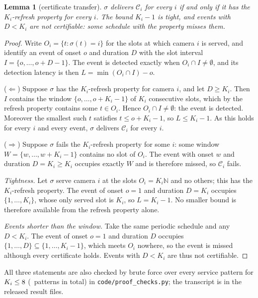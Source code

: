 \documentclass[final,5p,times,twocolumn]{elsarticle}
\newtheorem{lemma}[theorem]{Lemma}
\theoremstyle{definition}
\newcommand{\Ki}{K_i}
\newcommand{\sched}{\sigma}
\newcommand{\Dur}{D}
\newcommand{\Lat}{L}
\begin{document}
\begin{lemma}[certificate transfer]\label{lem:transfer}
$\sched$ delivers $\mathcal{C}_i$ for every $i$ if and only if it has the $\Ki$-refresh property
for every $i$. The bound $\Ki-1$ is tight, and events with $\Dur<\Ki$ are not certifiable: some
schedule with the property misses them.
\end{lemma}
\begin{proof}
Write $O_i=\{t:\sched(t)=i\}$ for the slots at which camera $i$ is served, and identify an
event of onset $o$ and duration $\Dur$ with the slot interval $I=\{o,\dots,o+\Dur-1\}$. The
event is detected exactly when $O_i\cap I\neq\emptyset$, and its detection latency is then
$\Lat=\min(O_i\cap I)-o$.

($\Leftarrow$) Suppose $\sched$ has the $\Ki$-refresh property for camera $i$, and let $\Dur\ge
\Ki$. Then $I$ contains the window $\{o,\dots,o+\Ki-1\}$ of $\Ki$ consecutive slots, which by
the refresh property contains some $t\in O_i$. Hence $O_i\cap I\neq\emptyset$: the event is
detected. Moreover the smallest such $t$ satisfies $t\le o+\Ki-1$, so $\Lat\le\Ki-1$. As this
holds for every $i$ and every event, $\sched$ delivers $\mathcal{C}_i$ for every $i$.

($\Rightarrow$) Suppose $\sched$ fails the $\Ki$-refresh property for some $i$: some window
$W=\{w,\dots,w+\Ki-1\}$ contains no slot of $O_i$. The event with onset $w$ and duration
$\Dur=\Ki\ge\Ki$ occupies exactly $W$ and is therefore missed, so $\mathcal{C}_i$ fails.

\emph{Tightness.} Let $\sched$ serve camera $i$ at the slots $O_i=\Ki\mathbb{N}$ and no others;
this has the $\Ki$-refresh property. The event of onset $o=1$ and duration $\Dur=\Ki$ occupies
$\{1,\dots,\Ki\}$, whose only served slot is $\Ki$, so $\Lat=\Ki-1$. No smaller bound is
therefore available from the refresh property alone.

\emph{Events shorter than the window.} Take the same periodic schedule and any $\Dur<\Ki$. The
event of onset $o=1$ and duration $\Dur$ occupies $\{1,\dots,\Dur\}\subseteq\{1,\dots,\Ki-1\}$,
which meets $O_i$ nowhere, so the event is missed although every certificate holds. Events with
$\Dur<\Ki$ are thus not certifiable.
\end{proof}

All three statements are also checked by brute force over every service pattern for
$\Ki\le\numCzeroKmax$ (\numCzeroPatterns\ patterns in total) in
\texttt{code/proof\_checks.py}; the transcript is in the released result files.
\end{document}
